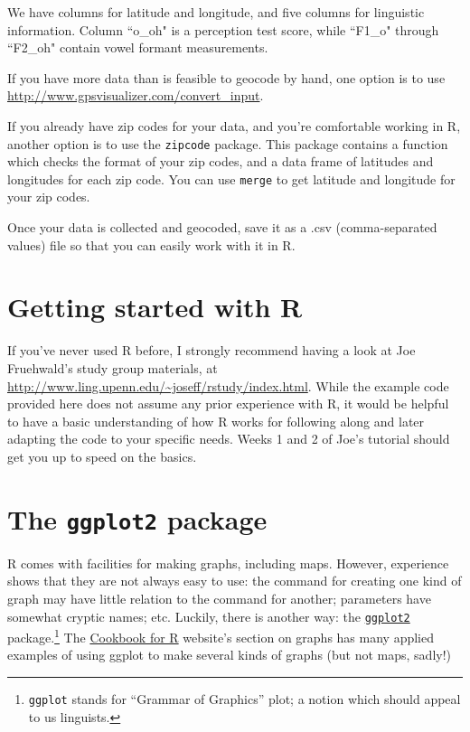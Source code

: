 \documentclass[12pt]{article}
\begin{document}
\noindent We have columns for latitude and longitude, and five columns for linguistic information. Column ``o\_oh" is a perception test score, while ``F1\_o" through ``F2\_oh" contain vowel formant measurements.

If you have more data than is feasible to geocode by hand, one option is to use \url{http://www.gpsvisualizer.com/convert_input}.

If you already have zip codes for your data, and you're comfortable working in R, another option is to use the \texttt{zipcode} package. This package contains a function which checks the format of your zip codes, and a data frame of latitudes and longitudes for each zip code. You can use \texttt{merge} to get latitude and longitude for your zip codes.

Once your data is collected and geocoded, save it as a .csv (comma-separated values) file so that you can easily work with it in R.

\section{Getting started with R}
If you've never used R before, I strongly recommend having a look at Joe Fruehwald's study group materials, at \url{http://www.ling.upenn.edu/~joseff/rstudy/index.html}. While the example code provided here does not assume any prior experience with R, it would be helpful to have a basic understanding of how R works for following along and later adapting the code to your specific needs. Weeks 1 and 2 of Joe's tutorial should get you up to speed on the basics.

\section{The \texttt{ggplot2} package}

R comes with facilities for making graphs, including maps.  However,
experience shows that they are not always easy to use: the command for
creating one kind of graph may have little relation to the command for
another; parameters have somewhat cryptic names; etc.  Luckily, there is
another way: the \href{http://ggplot2.org/}{\texttt{ggplot2}}
package.\footnote{\texttt{ggplot} stands for “Grammar of Graphics” plot;
    a notion which should appeal to us linguists.}  The
\href{http://www.cookbook-r.com/Graphs/}{Cookbook for R} website’s
section on graphs has many applied examples of using ggplot to make
several kinds of graphs (but not maps, sadly!)
\end{document}
